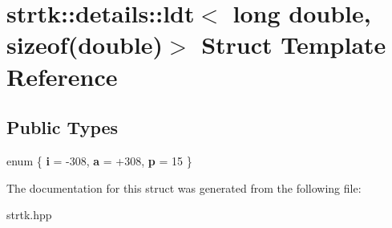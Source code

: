 \hypertarget{structstrtk_1_1details_1_1ldt_3_01long_01double_00_01sizeof_07double_08_4}{\section{strtk\-:\-:details\-:\-:ldt$<$ long double, sizeof(double)$>$ Struct Template Reference}
\label{structstrtk_1_1details_1_1ldt_3_01long_01double_00_01sizeof_07double_08_4}
}
\subsection*{Public Types}
\begin{DoxyCompactItemize}
\item 
enum \{ {\bfseries i} = -\/308, 
{\bfseries a} = +308, 
{\bfseries p} = 15
 \}
\end{DoxyCompactItemize}


The documentation for this struct was generated from the following file\-:\begin{DoxyCompactItemize}
\item 
strtk.\-hpp\end{DoxyCompactItemize}
